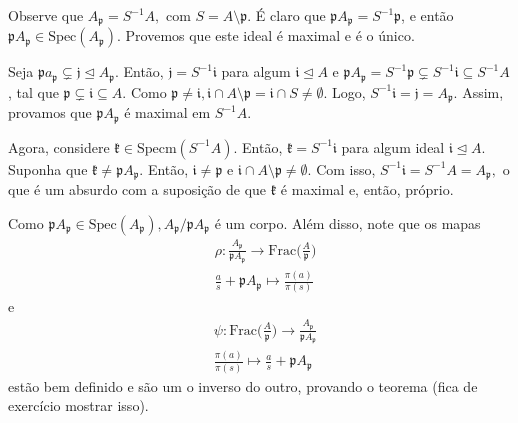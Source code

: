 \documentclass[AlgebraII/algebraII_notes.tex]{subfiles}
\begin{document}
\begin{proof*}
	Observe que \(A_{\mathfrak{p}}=S^{-1}A,\) com \(S=A\setminus{\mathfrak{p}}.\) É claro que \(\mathfrak{p}A_{\mathfrak{p}} = S^{-1}\mathfrak{p}\), e então
	\(\mathfrak{p}A_{\mathfrak{p}}\in \mathrm{Spec}(A_{\mathfrak{p}}).\) Provemos que este ideal é maximal e é o único.

	Seja \(\mathfrak{p}a_{\mathfrak{p}}\subsetneq \mathfrak{j}\trianglelefteq{A_{\mathfrak{p}}}. \) Então, \(\mathfrak{j} = S^{-1}\mathfrak{i}\) para algum \(\mathfrak{i}\trianglelefteq{A}\) e
	\(\mathfrak{p}A_{\mathfrak{p}} = S^{-1}\mathfrak{p}\subsetneq S^{-1}\mathfrak{i}\subseteq S^{-1}A \), tal que \(\mathfrak{p}\subsetneq \mathfrak{i}\subseteq A. \)
	Como \(\mathfrak{p}\neq \mathfrak{i}, \mathfrak{i}\cap A\setminus{\mathfrak{p}} = \mathfrak{i}\cap S \neq\emptyset\). Logo,
	\(S^{-1}\mathfrak{i} = \mathfrak{j} = A_{\mathfrak{p}}.\) Assim, provamos que \(\mathfrak{p}A_{\mathfrak{p}}\) é maximal em \(S^{-1}A.\)

	Agora, considere \(\mathfrak{k}\in \mathrm{Specm}(S^{-1}A)\). Então, \(\mathfrak{k} = S^{-1}\mathfrak{i}\) para algum ideal
	\(\mathfrak{i}\trianglelefteq{A}.\) Suponha que \(\mathfrak{k}\neq \mathfrak{p}A_{\mathfrak{p}}.\) Então, \(\mathfrak{i}\neq \mathfrak{p}\) e
	\(\mathfrak{i}\cap A\setminus{\mathfrak{p}}\neq\emptyset.\) Com isso, \(S^{-1}\mathfrak{i} = S^{-1}A = A_{\mathfrak{p}},\) o que é um absurdo com a
	suposição de que \(\mathfrak{k}\) é maximal e, então, próprio.

	Como \(\mathfrak{p}A_{\mathfrak{p}}\in \mathrm{Spec}(A_{\mathfrak{p}}), A_{\mathfrak{p}}/\mathfrak{p}A_{\mathfrak{p}}\) é um corpo. Além disso,
	note que os mapas
	\begin{align*}
		 & \rho :\frac{A_{\mathfrak{p}}}{\mathfrak{p}A_{\mathfrak{p}}}\rightarrow \mathrm{Frac}\biggl(\frac{A}{\mathfrak{p}}\biggr) \\
		 & \frac{a}{s} + \mathfrak{p}A_{\mathfrak{p}}\mapsto \frac{\pi (a)}{\pi (s)}
	\end{align*}
	e
	\begin{align*}
		 & \psi:\mathrm{Frac}\biggl(\frac{A}{\mathfrak{p}}\biggr)\rightarrow \frac{A_{\mathfrak{p}}}{\mathfrak{p}A_{\mathfrak{p}}} \\
		 & \frac{\pi (a)}{\pi (s)}\mapsto \frac{a}{s} + \mathfrak{p}A_{\mathfrak{p}}
	\end{align*}
	estão bem definido e são um o inverso do outro, provando o teorema (fica de exercício mostrar isso). \qedsymbol
\end{proof*}
\end{document}
